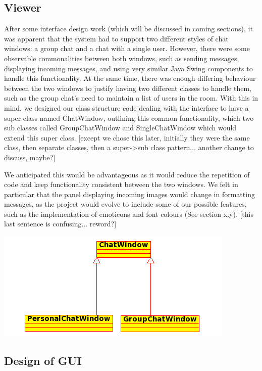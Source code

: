 \subsection {Viewer}

After some interface design work (which will be discussed in coming sections), it was apparent that the system had to support two different styles of chat windows: a group chat and a chat with a single user. However, there were some observable commonalities between both windows, such as sending messages, displaying incoming messages, and using very similar Java Swing components to handle this functionality. At the same time, there was enough differing behaviour between the two windows to justify having two different classes to handle them, such as the group chat's need to maintain a list of users in the room. With this in mind, we designed our class structure code dealing with the interface to have a super class named ChatWindow, outlining this common functionality, which two sub classes called GroupChatWindow and SingleChatWindow which would extend this super class. [except we chose this later, initially they were the same class, then separate classes, then a super->sub class pattern... another change to discuss, maybe?]%

We anticipated this would be advantageous as it would reduce the repetition of code and keep functionality consistent between the two windows. We felt in particular that the panel displaying incoming images would change in formatting messages, as the project would evolve to include some of our possible features, such as the implementation of emoticons and font colours (See section x.y). [this last sentence is confusing... reword?]

\includegraphics[scale=0.65]{Design/diagrams/chatwin.png}




\subsection{Design of GUI}


